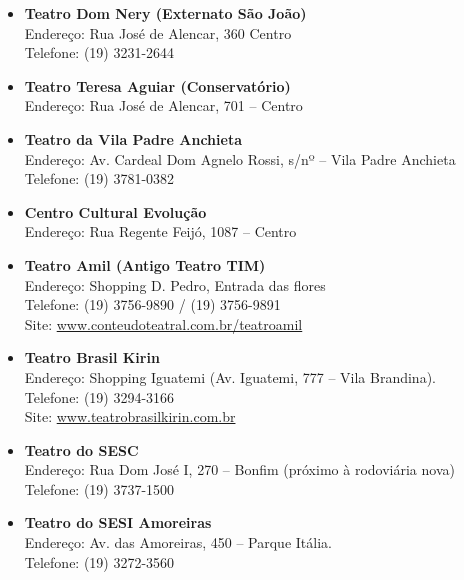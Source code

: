 \begin{itemize}
    \item   \textbf{Teatro Dom Nery (Externato São João)}
        \\Endereço: Rua José de Alencar, 360  Centro
        \\Telefone: (19) 3231-2644

     \item   \textbf{Teatro Teresa Aguiar (Conservatório)}
         \\Endereço: Rua José de Alencar, 701 -- Centro

    \item   \textbf{Teatro da Vila Padre Anchieta}
        \\Endereço: Av. Cardeal Dom Agnelo Rossi, s/nº -- Vila Padre Anchieta
        \\Telefone: (19) 3781-0382

     \item   \textbf{Centro Cultural Evolução}
         \\Endereço: Rua Regente Feijó, 1087 -- Centro

    \item   \textbf{Teatro Amil (Antigo Teatro TIM)}
        \\Endereço: Shopping D. Pedro, Entrada das flores
        \\Telefone: (19) 3756-9890 / (19) 3756-9891
		\\Site: \url{www.conteudoteatral.com.br/teatroamil}

    \item   \textbf{Teatro Brasil Kirin}
		\\Endereço: Shopping Iguatemi (Av. Iguatemi, 777 -- Vila Brandina).
		\\Telefone: (19) 3294-3166
		\\Site: \url{www.teatrobrasilkirin.com.br}

    \item   \textbf{Teatro do SESC}
		\\Endereço: Rua Dom José I, 270 -- Bonfim (próximo à rodoviária nova)
		\\Telefone: (19) 3737-1500

    \item   \textbf{Teatro do SESI Amoreiras}
		\\Endereço: Av. das Amoreiras, 450 -- Parque Itália.
		\\Telefone: (19) 3272-3560


\end{itemize}
